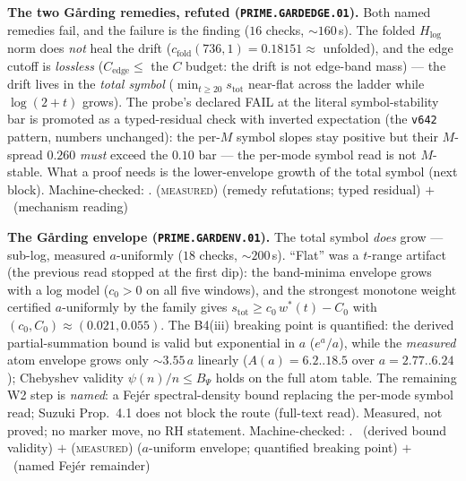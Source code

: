 \documentclass[11pt,a4paper]{article}
\theoremstyle{definition}
\begin{document}
\par\smallskip\noindent\textbf{The two G\aa rding remedies, refuted
(\texttt{PRIME.GARDEDGE.01}).}
Both named remedies fail, and the failure is the finding ($16$
checks, ${\sim}160$\,s).  The folded $H_{\log}$ norm does \emph{not}
heal the drift ($c_{\mathrm{fold}}(736,1)=0.18151\approx$ unfolded),
and the edge cutoff is \emph{lossless} ($C_{\mathrm{edge}}\le$ the
$C$ budget: the drift is not edge-band mass) --- the drift lives in
the \emph{total symbol} ($\min_{t\ge20}s_{\mathrm{tot}}$ near-flat
across the ladder while $\log(2+t)$ grows).  The probe's declared
FAIL at the literal symbol-stability bar is promoted as a
typed-residual check with inverted expectation (the \texttt{v642}
pattern, numbers unchanged): the per-$M$ symbol slopes stay positive
but their $M$-spread $0.260$ \emph{must} exceed the $0.10$ bar ---
the per-mode symbol read is not $M$-stable.  What a proof needs is
the lower-envelope growth of the total symbol (next block).
Machine-checked: .
(\textsc{measured}) (remedy refutations; typed residual) $+$ \mC\
(mechanism reading)
\par\smallskip

\par\smallskip\noindent\textbf{The G\aa rding envelope
(\texttt{PRIME.GARDENV.01}).}
The total symbol \emph{does} grow --- sub-log, measured
$a$-uniformly ($18$ checks, ${\sim}200$\,s).  ``Flat'' was a
$t$-range artifact (the previous read stopped at the first dip): the
band-minima envelope grows with a log model ($c_0>0$ on all five
windows), and the strongest monotone weight certified $a$-uniformly
by the family gives $s_{\mathrm{tot}}\ge c_0\,w^*(t)-C_0$ with
$(c_0,C_0)\approx(0.021,0.055)$.  The B4(iii) breaking point is
quantified: the derived partial-summation bound is valid but
exponential in $a$ ($e^a/a$), while the \emph{measured} atom
envelope grows only ${\sim}3.55\,a$ linearly ($A(a)=6.2..18.5$ over
$a=2.77..6.24$); Chebyshev validity $\psi(n)/n\le B_\Psi$ holds on
the full atom table.  The remaining W2 step is \emph{named}: a
Fej\'er spectral-density bound replacing the per-mode symbol read;
Suzuki Prop.~4.1 does not block the route (full-text read).
Measured, not proved; no marker move, no RH statement.
Machine-checked: .
\mE\ (derived bound validity) $+$ (\textsc{measured}) ($a$-uniform
envelope; quantified breaking point) $+$ \mC\ (named Fej\'er
remainder)
\par\smallskip
\end{document}
